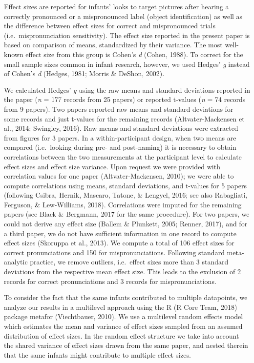 \documentclass[man]{apa6}
\begin{document}
Effect sizes are reported for infants' looks to target pictures after hearing a correctly pronounced or a mispronounced label (object identification) as well as the difference between effect sizes for correct and mispronounced trials (i.e.~mispronunciation sensitivity). The effect size reported in the present paper is based on comparison of means, standardized by their variance. The most well-known effect size from this group is Cohen's \emph{d} (Cohen, 1988). To correct for the small sample sizes common in infant research, however, we used Hedges' \emph{g} instead of Cohen's \emph{d} (Hedges, 1981; Morris \& DeShon, 2002).

We calculated Hedges' \emph{g} using the raw means and standard deviations reported in the paper (\emph{n} = 177 records from 25 papers) or reported t-values (\emph{n} = 74 records from 9 papers). Two papers reported raw means and standard deviations for some records and just t-values for the remaining records (Altvater-Mackensen et al., 2014; Swingley, 2016). Raw means and standard deviations were extracted from figures for 3 papers. In a within-participant design, when two means are compared (i.e.~looking during pre- and post-naming) it is necessary to obtain correlations between the two measurements at the participant level to calculate effect sizes and effect size variance. Upon request we were provided with correlation values for one paper (Altvater-Mackensen, 2010); we were able to compute correlations using means, standard deviations, and t-values for 5 papers (following Csibra, Hernik, Mascaro, Tatone, \& Lengyel, 2016; see also Rabagliati, Ferguson, \& Lew-Williams, 2018). Correlations were imputed for the remaining papers (see Black \& Bergmann, 2017 for the same procedure). For two papers, we could not derive any effect size (Ballem \& Plunkett, 2005; Renner, 2017), and for a third paper, we do not have sufficient information in one record to compute effect sizes (Skoruppa et al., 2013). We compute a total of 106 effect sizes for correct pronunciations and 150 for mispronunciations. Following standard meta-analytic practice, we remove outliers, i.e.~effect sizes more than 3 standard deviations from the respective mean effect size. This leads to the exclusion of 2 records for correct pronunciations and 3 records for mispronunciations.

To consider the fact that the same infants contributed to multiple datapoints, we analyze our results in a multilevel approach using the R (R Core Team, 2018) package metafor (Viechtbauer, 2010). We use a multilevel random effects model which estimates the mean and variance of effect sizes sampled from an assumed distribution of effect sizes. In the random effect structure we take into account the shared variance of effect sizes drawn from the same paper, and nested therein that the same infants might contribute to multiple effect sizes.
\end{document}

